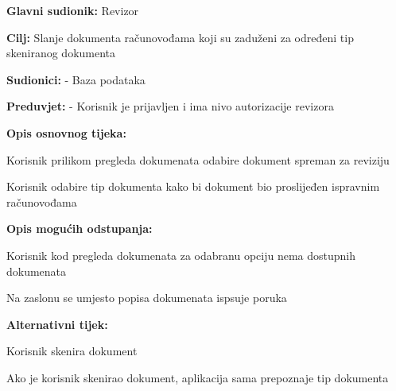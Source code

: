 					\noindent {}
						\begin{packed_item}
		
							\item \textbf{Glavni sudionik:} Revizor
							\item  \textbf{Cilj:} Slanje dokumenta računovođama koji su zaduženi za određeni tip skeniranog dokumenta
							\item  \textbf{Sudionici:} - Baza podataka
							\item  \textbf{Preduvjet:} - Korisnik je prijavljen i ima nivo autorizacije revizora
							\item  \textbf{Opis osnovnog tijeka:}
							
							\item[] \begin{packed_enum}
								\item Korisnik prilikom pregleda dokumenata odabire dokument spreman za reviziju
								\item Korisnik odabire tip dokumenta kako bi dokument bio proslijeđen ispravnim računovođama
							\end{packed_enum}
							
							\item  \textbf{Opis mogućih odstupanja:}
							
							\item[] \begin{packed_item}
		
								\item[1.a]Korisnik kod pregleda dokumenata za odabranu opciju nema dostupnih dokumenata
								\item[] \begin{packed_enum}
									\item Na zaslonu se umjesto popisa dokumenata ispsuje poruka
								\end{packed_enum}
							\end{packed_item}

							\item  \textbf{Alternativni tijek:}

							\item[] \begin{packed_item}
		
								\item[1.a]Korisnik skenira dokument
								\item[2.a]Ako je korisnik skenirao dokument, aplikacija sama prepoznaje tip dokumenta
							\end{packed_item}
						\end{packed_item}
